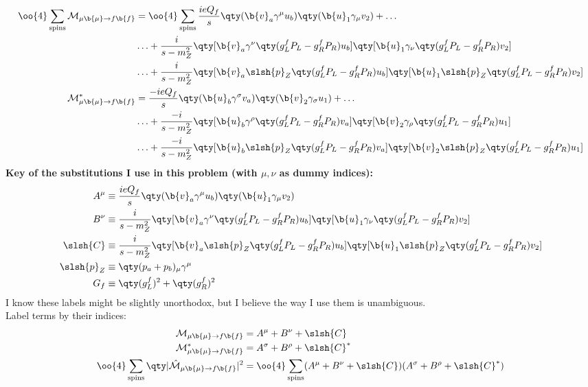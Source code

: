 
\begin{align}
	\begin{split}
		\oo{4}\sum_\text{spins}\mathcal{M}_{\mu\b{\mu}\rightarrow{f\b{f}}}&=
		\oo{4}\sum_\text{spins}
		\frac{ieQ_f}{s}\qty(\b{v}_a\gamma^\mu u_b)\qty(\b{u}_1\gamma_\mu v_2)+\ldots
		\\
		&\ldots
		+\frac{i}{s-m_Z^2}\qty[\b{v}_a\gamma^\nu\qty(g_L^fP_L-g_R^fP_R)u_b]
		\qty[\b{u}_1\gamma_\nu\qty(g_L^fP_L-g_R^fP_R)v_2]
		\\
		&\ldots
		+\frac{i}{s-m_Z^2}\qty[\b{v}_a\slsh{p}_Z\qty(g_L^fP_L-g_R^fP_R)u_b]
		\qty[\b{u}_1\slsh{p}_Z\qty(g_L^fP_L-g_R^fP_R)v_2]
	\end{split}
	\\
	\begin{split}
		\mathcal{M}_{\mu\b{\mu}\rightarrow{f\b{f}}}^*&=
		\frac{-ieQ_f}{s}\qty(\b{u}_b\gamma^\sigma v_a)\qty(\b{v}_2\gamma_\sigma u_1)+\ldots
		\\
		&\ldots
		+\frac{-i}{s-m_Z^2}\qty[\b{u}_b\gamma^\rho\qty(g_L^fP_L-g_R^fP_R)v_a]
		\qty[\b{v}_2\gamma_\rho\qty(g_L^fP_L-g_R^fP_R)u_1]
		\\
		&\ldots
		+\frac{-i}{s-m_Z^2}\qty[\b{u}_b\slsh{p}_Z\qty(g_L^fP_L-g_R^fP_R)v_a]
		\qty[\b{v}_2\slsh{p}_Z\qty(g_L^fP_L-g_R^fP_R)u_1]
	\end{split}
\end{align}
\textbf{Key of the substitutions I use in this problem (with $\mu,\nu$ as dummy indices):}
\begin{align*}
	A^\mu
	&\equiv\frac{ieQ_f}{s}\qty(\b{v}_a\gamma^\mu u_b)\qty(\b{u}_1\gamma_\mu v_2)
	\\
	B^\nu
	&\equiv\frac{i}{s-m_Z^2}\qty[\b{v}_a\gamma^\nu\qty(g_L^fP_L-g_R^fP_R)u_b]
	\qty[\b{u}_1\gamma_\nu\qty(g_L^fP_L-g_R^fP_R)v_2]
	\\
	\slsh{C}
	&\equiv\frac{i}{s-m_Z^2}\qty[\b{v}_a\slsh{p}_Z\qty(g_L^fP_L-g_R^fP_R)u_b]
	\qty[\b{u}_1\slsh{p}_Z\qty(g_L^fP_L-g_R^fP_R)v_2]
	\\
	\slsh{p}_Z
	&\equiv\qty(p_a+p_b)_\mu\gamma^\mu
	\\
	G_f
	&\equiv\qty(g_L^f)^2+\qty(g_R^f)^2
\end{align*}
I know these labels might be slightly unorthodox, but I believe the way I use them is unambiguous. 
\\
Label terms by their indices:
\begin{align}
	\mathcal{M}_{\mu\b{\mu}\rightarrow{f\b{f}}}&=A^\mu+B^\nu+\slsh{C}
	\\
	\mathcal{M}_{\mu\b{\mu}\rightarrow{f\b{f}}}^*&=A^\sigma+B^\rho+\slsh{C}^*
	\\
	\oo{4}\sum_\text{spins}\qty|\hat{\mathcal{M}}_{\mu\b{\mu}\rightarrow{f\b{f}}}|^2
	&=\oo{4}\sum_\text{spins}(A^\mu+B^\nu+\slsh{C})(A^\sigma+B^\rho+\slsh{C}^*)
\end{align}
